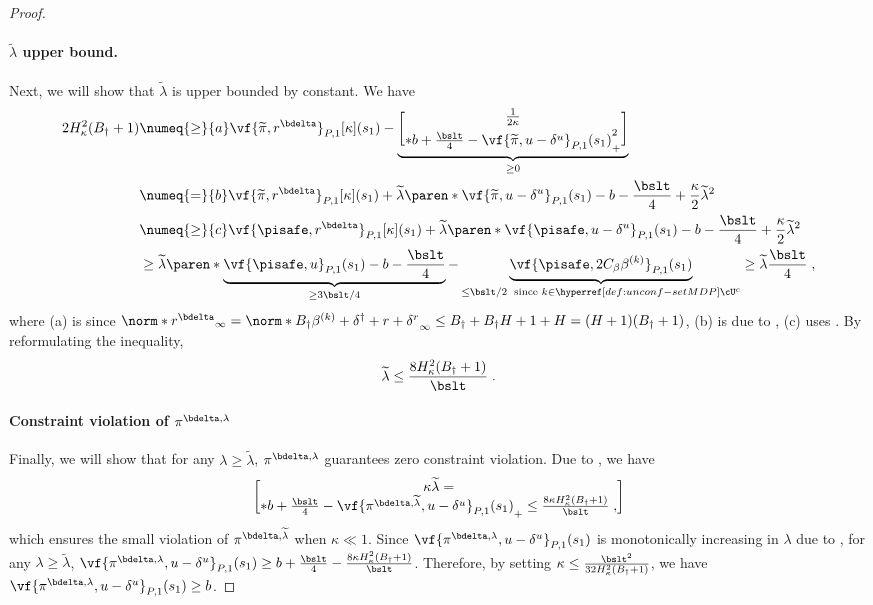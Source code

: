 \begin{proof}
\paragraph{$\widetilde{\lambda}$ upper bound.}
Next, we will show that $\widetilde{\lambda}$ is upper bounded by constant.
We have
\begin{align*}
2H^2_\kappa (B_\dagger + 1)
&\numeq{\geq}{a} 
\vf{\widetilde{\pi}, r^\bdelta}_{P, 1}[\kappa](s_1)  - \underbrace{\frac{1}{2\kappa}\brack*{b + \frac{\bslt}{4} - \vf{\widetilde{\pi}, u - \delta^u}_{P, 1}(s_1)}^2_+}_{\geq 0}\\
&\numeq{=}{b} \vf{\widetilde{\pi}, r^\bdelta}_{P, 1}[\kappa](s_1)  + \widetilde{\lambda} \paren*{\vf{\widetilde{\pi}, u - \delta^u}_{P, 1}(s_1) - b - \frac{\bslt}{4}} + \frac{\kappa}{2} \widetilde{\lambda}^2\\
&\numeq{\geq}{c} \vf{\pisafe, r^\bdelta}_{P, 1}[\kappa](s_1) 
+ \widetilde{\lambda} \paren*{\vf{\pisafe, u - \delta^u}_{P, 1}(s_1) - b - \frac{\bslt}{4}} + \frac{\kappa}{2} \widetilde{\lambda}^2\\
&\geq \widetilde{\lambda} \paren*{\underbrace{\vf{\pisafe, u}_{P, 1}(s_1) - b - \frac{\bslt}{4}}_{\geq 3\bslt / 4} 
-\underbrace{\vf{\pisafe,2C_\beta\beta^{(k)}}_{P, 1}(s_1)}_{\leq \bslt / 2 \;\text{ since } k \in \unconfMDP^c}
} \geq \widetilde{\lambda} \frac{\bslt}{4}\;,
\end{align*}
where (a) is since $\norm*{r^\bdelta}_\infty = \norm*{B_\dagger \beta^{(k)} + \delta^\dagger + r + \delta^r}_\infty 
\leq B_\dagger + B_\dagger H + 1 + H
= (H + 1)(B_\dagger + 1)$, (b) is due to , (c) uses .
By reformulating the inequality, 
\begin{align}\label{eq:lambda-upper-bound}
\widetilde{\lambda}  \leq  \frac{8H_\kappa^2(B_\dagger + 1)}{\bslt}\;.  
\end{align}


\paragraph{Constraint violation of $\pi^{\bdelta, \lambda}$}
Finally, we will show that for any $\lambda \geq \widetilde{\lambda}$, $\pi^{\bdelta, \lambda}$ guarantees zero constraint violation.
Due to , we have
\begin{align*}
\kappa \widetilde{\lambda} = \brack*{b + \frac{\bslt}{4}- \vf{\pi^{\bdelta, \widetilde{\lambda}}, u - \delta^u}_{P, 1}(s_1)}_+ \leq 
\frac{8\kappa H^2_\kappa (B_\dagger + 1)}{\bslt}\;,
\end{align*}
which ensures the small violation of $\pi^{\bdelta, \widetilde{\lambda}}$ when $\kappa \ll 1$. 
Since $\vf{\pi^{\bdelta, \lambda}, u - \delta^u}_{P, 1}(s_1)$ is monotonically increasing in $\lambda$ due to , for any $\lambda \geq \widetilde{\lambda}$, $\vf{\pi^{\bdelta, \lambda}, u - \delta^u}_{P, 1}(s_1) \geq b + \frac{\bslt}{4}- \frac{8\kappa H^2_\kappa (B_\dagger + 1)}{\bslt}$. 
Therefore, by setting 
$
\kappa \leq \frac{\bslt^2}{32H_\kappa^2 (B_\dagger + 1)}
$, we have 
$\vf{\pi^{\bdelta, \lambda}, u - \delta^u}_{P, 1}(s_1) \geq b$.
\end{proof}

